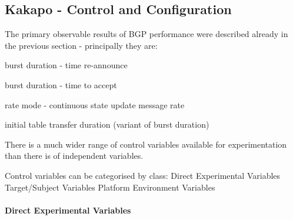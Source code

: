 \subsection{Kakapo - Control and Configuration}
The primary observable results of BGP performance were described already in the previous section - principally they are:

\begin{myitemize}
    \item burst duration - time re-announce
    \item burst duration - time to accept
    \item rate mode - continuous state update message rate
    \item initial table transfer duration (variant of burst duration)
\end{myitemize}

There is a much wider range of control variables available for experimentation than there is of independent variables.

\bigskip

Control variables can be categorised by class:
Direct Experimental Variables
Target/Subject Variables
Platform Environment Variables

\paragraph{Direct Experimental Variables}

